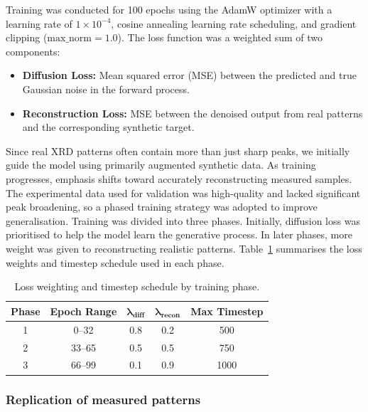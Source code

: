 Training was conducted for 100 epochs using the AdamW optimizer with a learning rate of $1 \times 10^{-4}$, cosine annealing learning rate scheduling, and gradient clipping ($\text{max\_norm} = 1.0$). The loss function was a weighted sum of two components:\\

\begin{itemize}
    \item \textbf{Diffusion Loss:} Mean squared error (MSE) between the predicted and true Gaussian noise in the forward process.
    \item \textbf{Reconstruction Loss:} MSE between the denoised output from real patterns and the corresponding synthetic target.
\end{itemize}

Since real XRD patterns often contain more than just sharp peaks, we initially guide the model using primarily augmented synthetic data. As training progresses, emphasis shifts toward accurately reconstructing measured samples. The experimental data used for validation was high-quality and lacked significant peak broadening, so a phased training strategy was adopted to improve generalisation. Training was divided into three phases. Initially, diffusion loss was prioritised to help the model learn the generative process. In later phases, more weight was given to reconstructing realistic patterns. Table~\ref{tab:loss-weights} summarises the loss weights and timestep schedule used in each phase.\\

\begin{table}[!h]
\centering
\caption{Loss weighting and timestep schedule by training phase.}
\label{tab:loss-weights}
\begin{tabular}{|c|c|c|c|c|}
\hline
\textbf{Phase} & \textbf{Epoch Range} & $\boldsymbol{\lambda_{\text{diff}}}$ & $\boldsymbol{\lambda_{\text{recon}}}$ & \textbf{Max Timestep} \\
\hline
1 & 0--32  & 0.8 & 0.2 & 500 \\
2 & 33--65 & 0.5 & 0.5 & 750 \\
3 & 66--99 & 0.1 & 0.9 & 1000 \\
\hline
\end{tabular}
\end{table}



\subsubsection{Replication of measured patterns}

